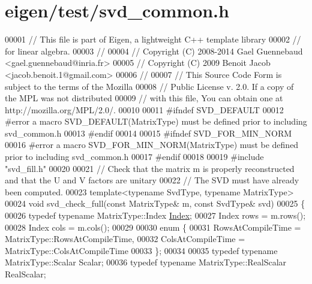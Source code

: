 \hypertarget{eigen_2test_2svd__common_8h_source}{}\section{eigen/test/svd\+\_\+common.h}
\label{eigen_2test_2svd__common_8h_source}

\begin{DoxyCode}
00001 \textcolor{comment}{// This file is part of Eigen, a lightweight C++ template library}
00002 \textcolor{comment}{// for linear algebra.}
00003 \textcolor{comment}{//}
00004 \textcolor{comment}{// Copyright (C) 2008-2014 Gael Guennebaud <gael.guennebaud@inria.fr>}
00005 \textcolor{comment}{// Copyright (C) 2009 Benoit Jacob <jacob.benoit.1@gmail.com>}
00006 \textcolor{comment}{//}
00007 \textcolor{comment}{// This Source Code Form is subject to the terms of the Mozilla}
00008 \textcolor{comment}{// Public License v. 2.0. If a copy of the MPL was not distributed}
00009 \textcolor{comment}{// with this file, You can obtain one at http://mozilla.org/MPL/2.0/.}
00010 
00011 \textcolor{preprocessor}{#ifndef SVD\_DEFAULT}
00012 \textcolor{preprocessor}{#error a macro SVD\_DEFAULT(MatrixType) must be defined prior to including svd\_common.h}
00013 \textcolor{preprocessor}{#endif}
00014 
00015 \textcolor{preprocessor}{#ifndef SVD\_FOR\_MIN\_NORM}
00016 \textcolor{preprocessor}{#error a macro SVD\_FOR\_MIN\_NORM(MatrixType) must be defined prior to including svd\_common.h}
00017 \textcolor{preprocessor}{#endif}
00018 
00019 \textcolor{preprocessor}{#include "svd\_fill.h"}
00020 
00021 \textcolor{comment}{// Check that the matrix m is properly reconstructed and that the U and V factors are unitary}
00022 \textcolor{comment}{// The SVD must have already been computed.}
00023 \textcolor{keyword}{template}<\textcolor{keyword}{typename} SvdType, \textcolor{keyword}{typename} MatrixType>
00024 \textcolor{keywordtype}{void} svd\_check\_full(\textcolor{keyword}{const} MatrixType& m, \textcolor{keyword}{const} SvdType& svd)
00025 \{
00026   \textcolor{keyword}{typedef} \textcolor{keyword}{typename} MatrixType::Index \hyperlink{namespace_eigen_a62e77e0933482dafde8fe197d9a2cfde}{Index};
00027   Index rows = m.rows();
00028   Index cols = m.cols();
00029 
00030   \textcolor{keyword}{enum} \{
00031     RowsAtCompileTime = MatrixType::RowsAtCompileTime,
00032     ColsAtCompileTime = MatrixType::ColsAtCompileTime
00033   \};
00034 
00035   \textcolor{keyword}{typedef} \textcolor{keyword}{typename} MatrixType::Scalar Scalar;
00036   \textcolor{keyword}{typedef} \textcolor{keyword}{typename} MatrixType::RealScalar RealScalar;

\end{DoxyCode}
